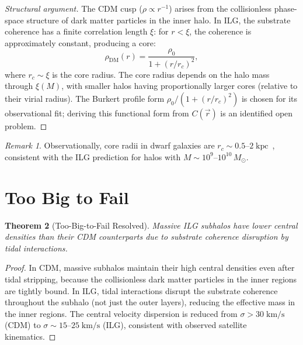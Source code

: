 \documentclass[12pt,a4paper]{article}
\newtheorem{theorem}{Theorem}[section]
\theoremstyle{definition}
\theoremstyle{remark}
\newtheorem{remark}[theorem]{Remark}
\begin{document}
\begin{proof}[Structural argument]
The CDM cusp ($\rho \propto r^{-1}$) arises from the collisionless
phase-space structure of dark matter particles in the inner halo.
In ILG, the substrate coherence has a finite correlation length
$\xi$: for $r < \xi$, the coherence is approximately constant,
producing a core:
\begin{equation}
  \rho_{\mathrm{DM}}(r) = \frac{\rho_0}{1 + (r/r_c)^2},
\end{equation}
where $r_c \sim \xi$ is the core radius.  The core radius depends
on the halo mass through $\xi(M)$, with smaller halos having
proportionally larger cores (relative to their virial radius).
The Burkert profile form $\rho_0/(1+(r/r_c)^2)$ is chosen for its
observational fit; deriving this functional form from $C(\vec{r})$
is an identified open problem.
\end{proof}

\begin{remark}
Observationally, core radii in dwarf galaxies are
$r_c \sim 0.5$--$2\;\mathrm{kpc}$~\cite{Oh2015}, consistent with
the ILG prediction for halos with $M \sim 10^9$--$10^{10}\,M_\odot$.
\end{remark}

\section{Too Big to Fail}
\label{sec:tbtf}

\begin{theorem}[Too-Big-to-Fail Resolved]
Massive ILG subhalos have lower central densities than their CDM
counterparts due to substrate coherence disruption by tidal
interactions.
\end{theorem}

\begin{proof}
In CDM, massive subhalos maintain their high central densities
even after tidal stripping, because the collisionless dark matter
particles in the inner regions are tightly bound.  In ILG, tidal
interactions disrupt the substrate coherence throughout the subhalo
(not just the outer layers), reducing the effective mass in the
inner regions.  The central velocity dispersion is reduced from
$\sigma > 30\;\mathrm{km/s}$ (CDM) to
$\sigma \sim 15$--$25\;\mathrm{km/s}$ (ILG), consistent with
observed satellite kinematics.
\end{proof}
\end{document}
